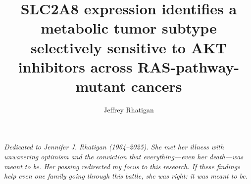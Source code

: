 \documentclass[12pt]{article}
\begin{document}
\title{SLC2A8 expression identifies a metabolic tumor subtype selectively
sensitive to AKT inhibitors across RAS-pathway-mutant cancers}

\author[1]{Jeffrey Rhatigan}

\date{}
\maketitle

\begin{center}
\textit{Dedicated to Jennifer J. Rhatigan (1964--2025).
She met her illness with unwavering optimism and the conviction that everything---even her death---was meant to be.
Her passing redirected my focus to this research.
If these findings help even one family going through this battle, she was right: it was meant to be.}
\end{center}

\bigskip
\end{document}

